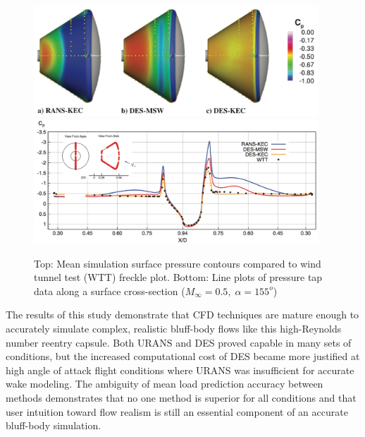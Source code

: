 \documentclass[journal]{new-aiaa}
\begin{document}
\begin{figure}[H]
\begin{center}
\includegraphics[width=0.95\textwidth]{Images/logan/schwing2015detachededdy_surfacepressure.pdf}
\includegraphics[width=0.95\textwidth]{Images/logan/schwing2015detachededdy_surfacetaps.pdf}
\caption{ Top: Mean simulation surface pressure contours compared to wind tunnel test (WTT) freckle plot. Bottom: Line plots of pressure tap data along a surface cross-section ($M_{\infty}=0.5,\;\alpha=155^o$) \cite{schwing2015detachededdy} }
\label{fig:orionpressure}
\end{center}
\end{figure}


The results of this study demonstrate that CFD techniques are mature enough to accurately simulate complex, realistic bluff-body flows like this high-Reynolds number reentry capsule.  Both URANS and DES proved capable in many sets of conditions, but the increased computational cost of DES became more justified at high angle of attack flight conditions where URANS was insufficient for accurate wake modeling.  The ambiguity of mean load prediction accuracy between methods demonstrates that no one method is superior for all conditions and that user intuition toward flow realism is still an essential component of an accurate bluff-body simulation.
\end{document}
